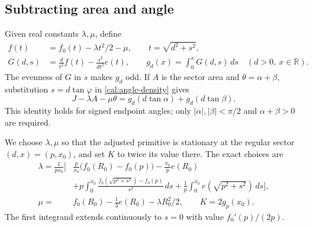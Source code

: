\subsection{Subtracting area and angle}
Given real constants $\lambda,\mu$, define
\begin{equation}\label{cal:primitive}
 \begin{split}
 f(t)&=f_0(t)-\lambda t^2/2-\mu,\qquad t=\sqrt{d^2+s^2},\\
 G(d,s)&=\frac d{t^2}f(t)-\frac{s^2}{dt^2}e(t),\qquad
 g_d(x)=\int_0^xG(d,s)\,ds\quad(d>0,\ x\in\mathbb R).
 \end{split}
\end{equation}
The evenness of $G$ in $s$ makes $g_d$ odd.  If $A$ is the sector area
and $\theta=\alpha+\beta$, substitution $s=d\tan\varphi$ in
\eqref{cal:angle-density} gives
\begin{equation}\label{cal:sector-primitive}
 J-\lambda A-\mu\theta
       =g_d(d\tan\alpha)+g_d(d\tan\beta).
\end{equation}
This identity holds for signed endpoint angles; only
$|\alpha|,|\beta|<\pi/2$ and $\alpha+\beta>0$ are required.

We choose $\lambda,\mu$ so that the adjusted primitive is stationary
at the regular sector $(d,x)=(p,x_0)$, and set $K$ to twice its value
there.  The exact choices are
\begin{equation}\label{cal:constants}
 \begin{split}
 \lambda=\frac1{px_0}\biggl[&\frac p{x_0}\bigl(f_0(R_0)-f_0(p)\bigr)
                 -\frac{x_0}{p}e(R_0)\\
 &+p\int_0^{x_0}\frac{f_0(\sqrt{p^2+s^2})-f_0(p)}{s^2}\,ds
                 +\frac1p\int_0^{x_0}e(\sqrt{p^2+s^2})\,ds\biggr],\\
 \mu={}&f_0(R_0)-\frac13e(R_0)-\lambda R_0^2/2,\qquad
 K=2g_p(x_0).
 \end{split}
\end{equation}
The first integrand extends continuously to $s=0$ with value
$f_0'(p)/(2p)$.

